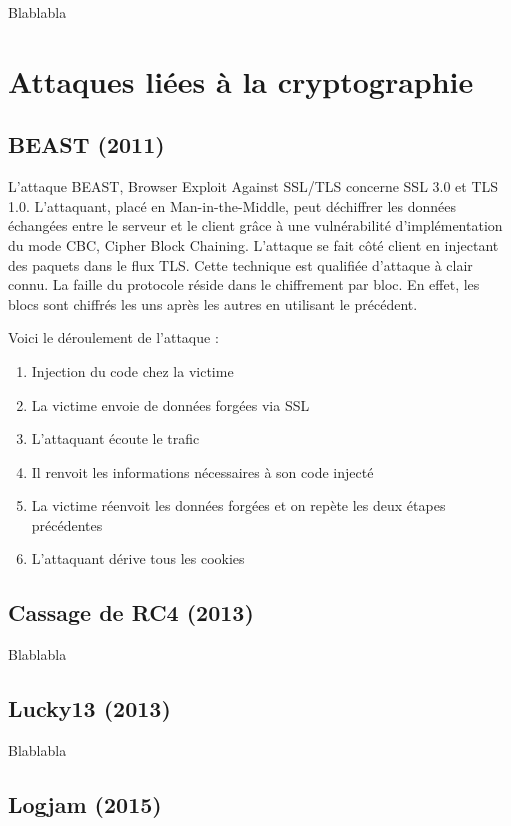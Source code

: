 Blablabla \cite{berserk}

\section{Attaques liées à la cryptographie}

\subsection{BEAST (2011)}
L'attaque BEAST, Browser Exploit Against SSL/TLS concerne SSL 3.0 et TLS 1.0. L'attaquant, placé en Man-in-the-Middle, peut déchiffrer les données échangées entre le serveur et le client grâce à une vulnérabilité d'implémentation du mode CBC, Cipher Block Chaining. L'attaque se fait côté client en injectant des paquets dans le flux TLS. Cette technique est qualifiée d'attaque à clair connu. La faille du protocole réside dans le chiffrement par bloc. En effet, les blocs sont chiffrés les uns après les autres en utilisant le précédent.

Voici le déroulement de l'attaque :

\begin{enumerate}
\item Injection du code chez la victime
\item La victime envoie de données forgées via SSL
\item L'attaquant écoute le trafic
\item Il renvoit les informations nécessaires à son code injecté
\item La victime réenvoit les données forgées et on repète les deux étapes précédentes
  \item L'attaquant dérive tous les cookies
\end{enumerate}
\cite{beast}

\subsection{Cassage de RC4 (2013)}

Blablabla \cite{rc4}

\subsection{Lucky13 (2013)}

Blablabla \cite{lucky13}

\subsection{Logjam (2015)}

